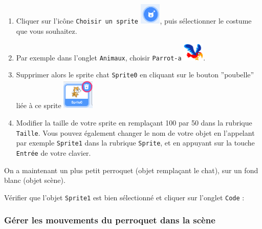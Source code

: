 \begin{enumerate}
\item Cliquer sur l'icône \texttt{Choisir un sprite} \includegraphics[width=1cm]{./images/scratch/sprite.png}, puis sélectionner le costume que vous souhaitez.
\item Par exemple dans l'onglet \texttt{Animaux}, choisir \texttt{Parrot-a} \includegraphics[width=1cm]{./images/scratch/parrot.png}.
\item Supprimer alors le sprite chat \texttt{Sprite0} en cliquant sur le bouton ''poubelle'' liée à ce sprite \includegraphics[width=1.5cm]{./images/scratch/poubelleChat.png}
\item Modifier la taille de votre sprite en remplaçant 100 par 50 dans la rubrique \texttt{Taille}. Vous pouvez également changer le nom de votre objet en l'appelant par exemple \texttt{Sprite1} dans la rubrique \texttt{Sprite}, et en appuyant sur la touche \texttt{Entrée} de votre clavier.
\end{enumerate}
On a maintenant un plus petit perroquet (objet remplaçant le chat), sur un fond blanc (objet scène).

Vérifier que l'objet \texttt{Sprite1} est bien sélectionné et cliquer sur l'onglet \texttt{Code} :







\subsubsection{Gérer les mouvements du perroquet dans la scène}  

